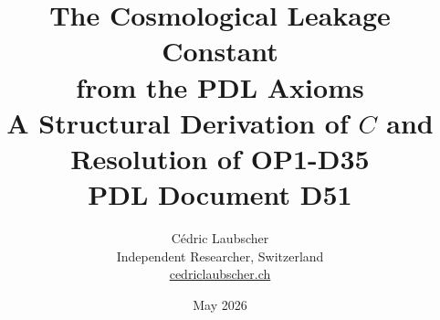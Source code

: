 \documentclass[12pt,a4paper]{article}
\begin{document}
\title{\textbf{The Cosmological Leakage Constant\\
from the PDL Axioms}\\[6pt]
{\large A Structural Derivation of $C$ and Resolution of OP1-D35}\\[4pt]
{\large PDL Document D51}}

\author{C\'edric Laubscher\\[4pt]
\small Independent Researcher, Switzerland\\
\small \href{https://cedriclaubscher.ch}{cedriclaubscher.ch}}

\date{May 2026}

\maketitle
\end{document}
